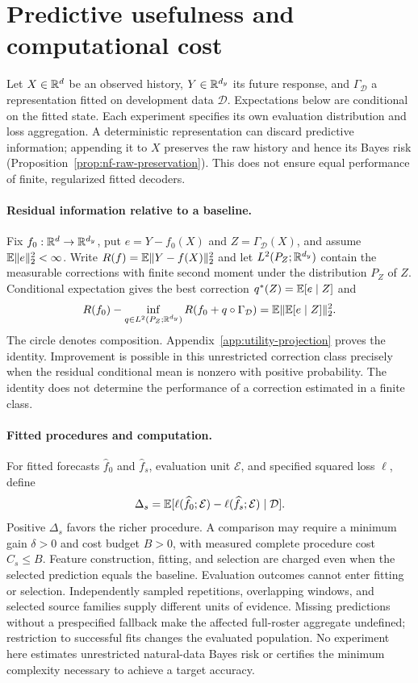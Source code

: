 \section{Predictive usefulness and computational cost}
\label{sec:utility-question}
Let $X\in\mathbb{R}^d$ be an observed history, $Y\in\mathbb{R}^{d_y}$ its future
response, and $\Gamma_{\mathcal D}$ a representation fitted on development
data $\mathcal D$. Expectations below are conditional on the fitted
state. Each experiment specifies its own evaluation distribution and
loss aggregation. A deterministic representation can discard predictive
information; appending it to $X$ preserves the raw history and hence its
Bayes risk (Proposition~\ref{prop:nf-raw-preservation}). This does not
ensure equal performance of finite, regularized fitted decoders.

\paragraph{Residual information relative to a baseline.}
Fix $f_0:\mathbb{R}^d\to\mathbb{R}^{d_y}$, put $e=Y-f_0(X)$ and
$Z=\Gamma_{\mathcal D}(X)$, and assume $\mathbb{E}\|e\|_2^2<\infty$.
Write $R(f)=\mathbb{E}\|Y-f(X)\|_2^2$ and let
$L^2(P_Z;\mathbb{R}^{d_y})$ contain the measurable corrections with finite
second moment under the distribution $P_Z$ of $Z$. Conditional
expectation gives the best correction $q^*(Z)=\mathbb{E}[e\mid Z]$ and
\begin{equation}\label{eq:utility-oracle}
 R(f_0)-\inf_{q\in L^2(P_Z;\mathbb{R}^{d_y})}
 R(f_0+q\circ\Gamma_{\mathcal D})
 =\mathbb{E}\|\mathbb{E}[e\mid Z]\|_2^2.
\end{equation}
The circle denotes composition. Appendix~\ref{app:utility-projection}
proves the identity. Improvement is possible in this unrestricted
correction class precisely when the residual conditional mean is
nonzero with positive probability. The identity does not determine the
performance of a correction estimated in a finite class.

\paragraph{Fitted procedures and computation.}
For fitted forecasts $\widehat f_0$ and $\widehat f_s$, evaluation unit
$\mathcal E$, and specified squared loss $\ell$, define
\begin{equation}\label{eq:utility-delta}
 \Delta_s=\mathbb{E}[\ell(\widehat f_0;\mathcal E)
             -\ell(\widehat f_s;\mathcal E)\mid\mathcal D].
\end{equation}
Positive $\Delta_s$ favors the richer procedure. A comparison may require
a minimum gain $\delta>0$ and cost budget $B>0$, with measured complete
procedure cost $C_s\leq B$. Feature construction, fitting, and selection
are charged even when the selected prediction equals the baseline.
Evaluation outcomes cannot enter fitting or selection. Independently
sampled repetitions, overlapping windows, and selected source families
supply different units of evidence. Missing predictions without a
prespecified fallback make the affected full-roster aggregate undefined;
restriction to successful fits changes the evaluated population. No
experiment here estimates unrestricted natural-data Bayes risk or
certifies the minimum complexity necessary to achieve a target accuracy.

